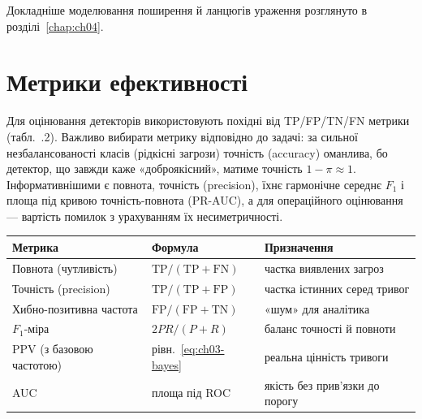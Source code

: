 \begin{tikzfig}
\end{tikzfig}

Докладніше моделювання поширення й ланцюгів ураження розглянуто в розділі~\ref{chap:ch04}.

\section{Метрики ефективності}\label{sec:ch03-metrics}

Для оцінювання детекторів використовують похідні від TP/FP/TN/FN метрики (табл.~\thechapter.2). Важливо вибирати метрику відповідно до задачі: за сильної незбалансованості класів (рідкісні загрози) точність (accuracy) оманлива, бо детектор, що завжди каже «доброякісний», матиме точність $1-\pi \approx 1$. Інформативнішими є повнота, точність (precision), їхнє гармонічне середнє $F_1$ і площа під кривою точність-повнота (PR-AUC), а для операційного оцінювання --- вартість помилок з урахуванням їх несиметричності.


\begin{center}\footnotesize
\begin{tabularx}{\linewidth}{L{26mm} L{30mm} Y}
\toprule
Метрика & Формула & Призначення \\
\midrule
Повнота (чутливість) & $\mathrm{TP}/(\mathrm{TP}+\mathrm{FN})$ & частка виявлених загроз \\
Точність (precision) & $\mathrm{TP}/(\mathrm{TP}+\mathrm{FP})$ & частка істинних серед тривог \\
Хибно-позитивна частота & $\mathrm{FP}/(\mathrm{FP}+\mathrm{TN})$ & «шум» для аналітика \\
$F_1$-міра & $2PR/(P{+}R)$ & баланс точності й повноти \\
PPV (з базовою частотою) & рівн.~\eqref{eq:ch03-bayes} & реальна цінність тривоги \\
AUC & площа під ROC & якість без прив'язки до порогу \\
\bottomrule
\end{tabularx}
\end{center}

